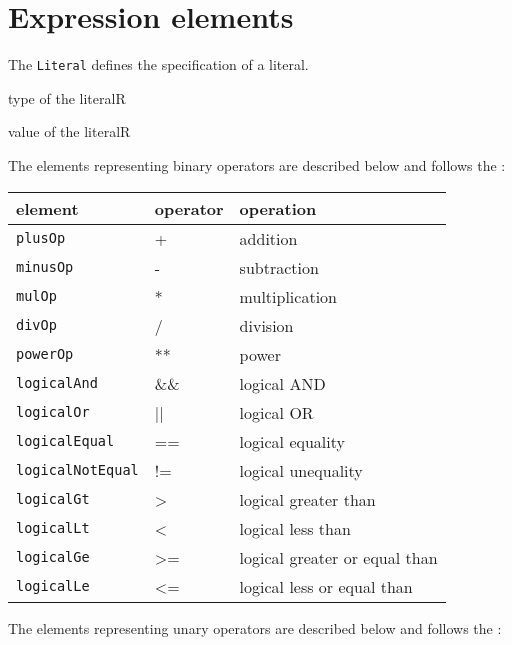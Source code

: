 \section{Expression elements}


The {\tt Literal} defines the specification of a literal.

\begin{HIRChildElements}
	{type of the literal}{R}
\end{HIRChildElements}

\begin{HIRAttributes}
	{value of the literal}{R}
\end{HIRAttributes}


The elements representing binary operators are described below and follows the
: 

\begin{tabular}{|l|p{4cm}|l|}
	\hline
	 element & operator & operation \\ \hline\hline
	 {\tt plusOp} & + & addition \\ \hline 
	 {\tt minusOp} & - & subtraction \\ \hline 
	 {\tt mulOp} & * & multiplication \\ \hline 
	 {\tt divOp} & / & division \\ \hline 
	 {\tt powerOp} & ** & power \\ \hline 
	 {\tt logicalAnd} & \&\& & logical AND \\ \hline 
	 {\tt logicalOr} & || & logical OR \\ \hline 
	 {\tt logicalEqual} & == & logical equality \\ \hline 
	 {\tt logicalNotEqual} & != & logical unequality \\ \hline 
	 {\tt logicalGt} & > & logical greater than \\ \hline 
	 {\tt logicalLt} & < & logical less than \\ \hline 
	 {\tt logicalGe} & >= & logical greater or equal than \\ \hline 
	 {\tt logicalLe} & <= & logical less or equal than \\ \hline 
\end{tabular}



The elements representing unary operators are described below and follows the
: 

